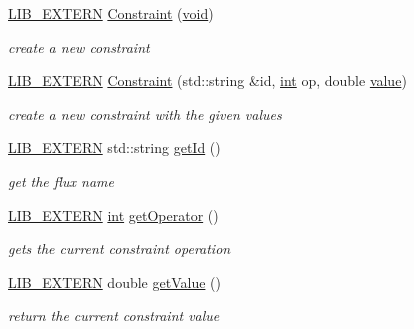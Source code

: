 \begin{DoxyCompactItemize}
\item 
\hyperlink{libutil_8h_a48cc004c21e097c0d7c1c5fa8dc03b96}{L\+I\+B\+\_\+\+E\+X\+T\+E\+RN} \hyperlink{class_l_i_b___s_t_r_u_c_t_u_r_a_l_1_1_constraint_a580c1d8001429e6fb40ab8e0c9cf8b49}{Constraint} (\hyperlink{lp__lib_8h_ac7828c7b2b31d2e11af17bdb6289c5d9}{void})
\begin{DoxyCompactList}\small\item\em create a new constraint \end{DoxyCompactList}\item 
\hyperlink{libutil_8h_a48cc004c21e097c0d7c1c5fa8dc03b96}{L\+I\+B\+\_\+\+E\+X\+T\+E\+RN} \hyperlink{class_l_i_b___s_t_r_u_c_t_u_r_a_l_1_1_constraint_aadd35ff7fff4336f2e119d29a2707217}{Constraint} (std\+::string \&id, \hyperlink{lp__lib_8h_adeb9ec6400320e4923ac9d836d509ddb}{int} op, double \hyperlink{lp__lib_8h_a606ba870f46e132d61b5e2371014a998}{value})
\begin{DoxyCompactList}\small\item\em create a new constraint with the given values \end{DoxyCompactList}\item 
\hyperlink{libutil_8h_a48cc004c21e097c0d7c1c5fa8dc03b96}{L\+I\+B\+\_\+\+E\+X\+T\+E\+RN} std\+::string \hyperlink{class_l_i_b___s_t_r_u_c_t_u_r_a_l_1_1_constraint_a8ea80b06677a40626d06cbeed4bfb1ce}{get\+Id} ()
\begin{DoxyCompactList}\small\item\em get the flux name \end{DoxyCompactList}\item 
\hyperlink{libutil_8h_a48cc004c21e097c0d7c1c5fa8dc03b96}{L\+I\+B\+\_\+\+E\+X\+T\+E\+RN} \hyperlink{lp__lib_8h_adeb9ec6400320e4923ac9d836d509ddb}{int} \hyperlink{class_l_i_b___s_t_r_u_c_t_u_r_a_l_1_1_constraint_a0a3e670b13f8fa0b5b5e3df1b8a45269}{get\+Operator} ()
\begin{DoxyCompactList}\small\item\em gets the current constraint operation \end{DoxyCompactList}\item 
\hyperlink{libutil_8h_a48cc004c21e097c0d7c1c5fa8dc03b96}{L\+I\+B\+\_\+\+E\+X\+T\+E\+RN} double \hyperlink{class_l_i_b___s_t_r_u_c_t_u_r_a_l_1_1_constraint_aed34118212170a0c8297a259d3adfcce}{get\+Value} ()
\begin{DoxyCompactList}\small\item\em return the current constraint value \end{DoxyCompactList}\item 

\end{DoxyCompactItemize}
